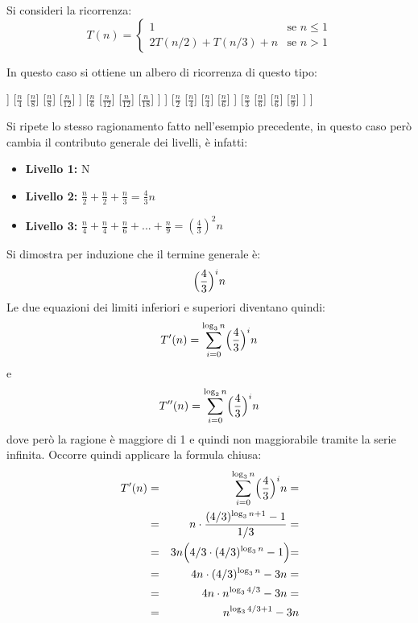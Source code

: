 \begin{example}
Si consideri la ricorrenza:
	\begin{displaymath}
	T(n)=
	\begin{cases}
		1 & \mbox{se } n \leq 1 \\
		2T(n/2)+T(n/3)+n & \mbox{se } n>1
	\end{cases}
\end{displaymath}
\end{example}

In questo caso si ottiene un albero di ricorrenza di questo tipo:
\begin{center}
\begin{forest}
[$n$
	[$\frac{n}{2}$
		[$\frac{n}{4}$
			[$\frac{n}{8}$]
			[$\frac{n}{8}$]
			[$\frac{n}{12}$]
		]
		[$\frac{n}{4}$
			[$\frac{n}{8}$]
			[$\frac{n}{8}$]
			[$\frac{n}{12}$]
		]
		[$\frac{n}{6}$
			[$\frac{n}{12}$]
			[$\frac{n}{12}$]
			[$\frac{n}{18}$]
		]
	]
	[$\frac{n}{2}$
		[$\frac{n}{4}$]
		[$\frac{n}{4}$]
		[$\frac{n}{6}$]
	]
	[$\frac{n}{3}$
		[$\frac{n}{6}$]
		[$\frac{n}{6}$]
		[$\frac{n}{9}$]
	]
]
\end{forest}
\end{center}
Si ripete lo stesso ragionamento fatto nell'esempio precedente, in questo caso però cambia il contributo generale dei livelli, è infatti:
\begin{itemize}
	\item \textbf{Livello 1:} N
	\item \textbf{Livello 2:} $\frac{n}{2}+\frac{n}{2}+\frac{n}{3}=\frac{4}{3}n$
	\item \textbf{Livello 3:} $\frac{n}{4}+\frac{n}{4}+\frac{n}{6}+...+\frac{n}{9}=(\frac{4}{3})^{2}n$
\end{itemize}
Si dimostra per induzione che il termine generale è: $$\Bigl(\frac{4}{3}\Bigl)^{i}n$$
Le due equazioni dei limiti inferiori e superiori diventano quindi:
\begin{displaymath}
	T'(n)=\sum_{i=0}^{\log_{3}n}\Bigl(\frac{4}{3}\Bigl)^{i}n
\end{displaymath}
e
\begin{displaymath}
	T''(n)=\sum_{i=0}^{\log_{2}n}\Bigl(\frac{4}{3}\Bigl)^{i}n
\end{displaymath}
dove però la ragione è maggiore di 1 e quindi non maggiorabile tramite la serie infinita. Occorre quindi applicare la formula chiusa:
\begin{eqnarray*}
	T'(n)&=&\sum_{i=0}^{\log_{3}n}\Bigl(\frac{4}{3}\Bigl)^{i}n =\\
	&=& n \cdot \frac{(4/3)^{\log_{3}n+1}-1}{1/3} = \\
	&=& 3n \Bigl(4/3 \cdot (4/3)^{\log_{3}n}-1 \Bigl) = \\
	&=& 4n\cdot (4/3)^{\log_{3}n}-3n =\\
	&=& 4n \cdot n^{\log_{3}4/3}-3n = \\
	&=& n^{\log_{3}4/3+1}-3n
\end{eqnarray*}
